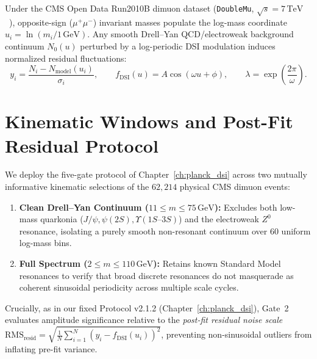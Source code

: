 Under the CMS Open Data Run2010B dimuon dataset (\texttt{DoubleMu}, $\sqrt{s} = 7\,\mathrm{TeV}$~\cite{cms2010dimuon}), opposite-sign ($\mu^+\mu^-$) invariant masses populate the log-mass coordinate $u_i = \ln(m_i / 1\,\mathrm{GeV})$. Any smooth Drell--Yan QCD/electroweak background continuum $N_0(u)$ perturbed by a log-periodic DSI modulation induces normalized residual fluctuations:
\begin{equation}
y_i = \frac{N_i - N_{\mathrm{model}}(u_i)}{\sigma_i}, \qquad f_{\mathrm{DSI}}(u) = A \cos(\omega u + \phi), \qquad \lambda = \exp\!\left(\frac{2\pi}{\omega}\right).
\end{equation}

\section{Kinematic Windows and Post-Fit Residual Protocol}
We deploy the five-gate protocol of Chapter~\ref{ch:planck_dsi} across two mutually informative kinematic selections of the $62,214$ physical CMS dimuon events:
\begin{enumerate}
    \item \textbf{Clean Drell--Yan Continuum ($11 \le m \le 75\,\mathrm{GeV}$):} Excludes both low-mass quarkonia ($J/\psi, \psi(2S), \Upsilon(1S\text{--}3S)$) and the electroweak $Z^0$ resonance, isolating a purely smooth non-resonant continuum over $60$ uniform log-mass bins.
    \item \textbf{Full Spectrum ($2 \le m \le 110\,\mathrm{GeV}$):} Retains known Standard Model resonances to verify that broad discrete resonances do not masquerade as coherent sinusoidal periodicity across multiple scale cycles.
\end{enumerate}
Crucially, as in our fixed Protocol v2.1.2 (Chapter~\ref{ch:planck_dsi}), Gate~2 evaluates amplitude significance relative to the \textit{post-fit residual noise scale} $\mathrm{RMS}_{\mathrm{resid}} = \sqrt{\frac{1}{N}\sum_{i=1}^N (y_i - f_{\mathrm{DSI}}(u_i))^2}$, preventing non-sinusoidal outliers from inflating pre-fit variance.

